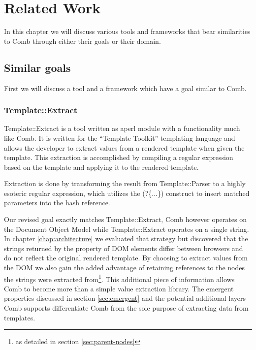 \documentclass[thesis.tex]{subfiles}
\begin{document}
\chapter{Related Work}
\label{chap:related}
In this chapter we will discuss various tools and frameworks that bear
similarities to Comb through either their goals or their domain.


\section{Similar goals}
First we will discuss a tool and a framework which have a goal similar to Comb.

\subsection{Template::Extract}
Template::Extract\cite{TPLEXTRACT} is a tool written as aperl module with a
functionality much like Comb. It is written for the ``Template Toolkit''
templating language and allows the developer to extract values from a rendered
template when given the template.
This extraction is accomplished by compiling a regular expression based on the
template and applying it to the rendered template.

\begin{citequote}{\cite{TPLEXTRACT}}
Extraction is done by transforming the result from Template::Parser to a highly
esoteric regular expression, which utilizes the (?\{...\}) construct to insert
matched parameters into the hash reference.
\end{citequote}

Our revised goal exactly matches Template::Extract, Comb however operates on the
Document Object Model while Template::Extract operates on a single string.
In chapter \ref{chap:architecture} we evaluated that strategy but discovered
that the strings returned by the  property of DOM elements
differ between browsers and do not reflect the original rendered template.
By choosing to extract values from the DOM we also gain the added advantage
of retaining references to the nodes the strings were extracted from\footnote{
	as detailed in section \ref{sec:parent-nodes}
}.
This additional piece of information allows Comb to become more than a simple
value extraction library. The emergent properties discussed in
section \ref{sec:emergent} and the potential additional layers Comb supports
differentiate Comb from the sole purpose of extracting data from templates.
\end{document}
